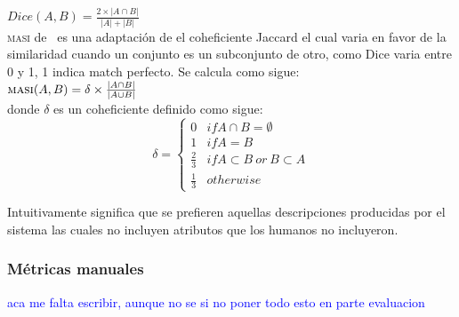 $Dice(A,B) = \frac{2\times|A \cap B|}{|A|+|B|}$\\

\textsc{masi} de \cite{Passonneau06measuringagreement}~es una adaptaci\'on de el coheficiente Jaccard el cual varia en favor de la similaridad cuando un conjunto es un subconjunto de otro, como Dice varia entre 0 y 1, 1 indica match perfecto. Se calcula como sigue:\\

$\textsc{masi}(A,B) = \delta \times \frac{|A \cap B|}{|A \cup B|}$ \\


donde $\delta$ es un coheficiente definido como sigue:\\


 \begin{equation}
     \delta  = \left\{
	       \begin{array}{ll}
		 0      & if A \cap B = \emptyset \\
		 1 & if A = B  \\
		 \frac{2}{3}     & if A \subset B ~or~ B \subset A\\
		 \frac{1}{3}     & otherwise
	       \end{array}
	     \right.
 \end{equation}

Intuitivamente significa que se prefieren aquellas descripciones producidas por el sistema las cuales no incluyen atributos que los humanos no incluyeron.

\subsubsection{M\'etricas manuales}
\textcolor{blue}{aca me falta escribir, aunque no se si no poner todo esto en parte evaluacion}
